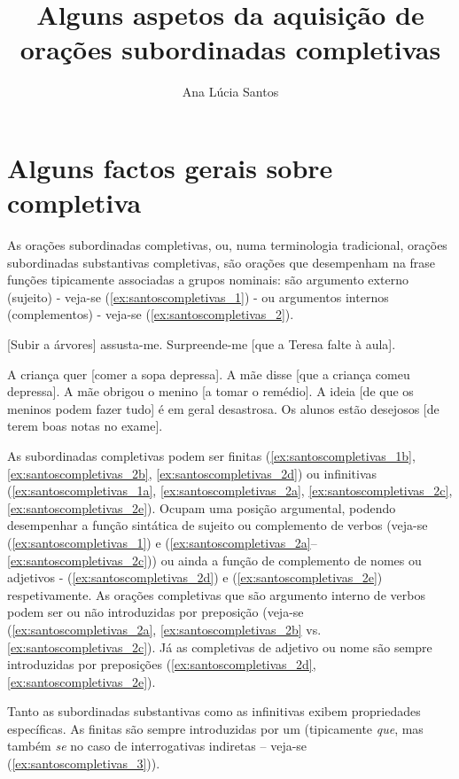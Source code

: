 \documentclass[output=paper]{LSP/langsci}
\author{Ana Lúcia Santos\affiliation{Universidade de Lisboa, Faculdade de Letras, Centro de Linguística}
}
\title{Alguns aspetos da aquisição de orações subordinadas completivas}
\begin{document}
\section{Alguns factos gerais sobre  completiva} 
\label{sec:santoscompletivas_alguns_factos}

As orações subordinadas completivas, ou, numa terminologia tradicional, orações subordinadas substantivas completivas, são orações que desempenham na frase funções tipicamente associadas a grupos nominais: são argumento externo (sujeito) - veja-se (\ref{ex:santoscompletivas_1}) - ou argumentos internos (complementos) - veja-se (\ref{ex:santoscompletivas_2}).

\ea\label{ex:santoscompletivas_1}
\ea\label{ex:santoscompletivas_1a} [Subir a árvores] assusta-me.
\ex\label{ex:santoscompletivas_1b} Surpreende-me [que a Teresa falte à aula].
\zl

\ea\label{ex:santoscompletivas_2}
\ea\label{ex:santoscompletivas_2a} A criança quer [comer a sopa depressa].
\ex\label{ex:santoscompletivas_2b} A mãe disse [que a criança comeu depressa].
\ex\label{ex:santoscompletivas_2c} A mãe obrigou o menino [a tomar o remédio].
\ex\label{ex:santoscompletivas_2d} A ideia [de que os meninos podem fazer tudo] é em geral desastrosa.
\ex\label{ex:santoscompletivas_2e} Os alunos estão desejosos [de terem boas notas no exame].
\zl

As subordinadas completivas podem ser finitas (\ref{ex:santoscompletivas_1b}, \ref{ex:santoscompletivas_2b}, \ref{ex:santoscompletivas_2d}) ou infinitivas (\ref{ex:santoscompletivas_1a}, \ref{ex:santoscompletivas_2a}, \ref{ex:santoscompletivas_2c}, \ref{ex:santoscompletivas_2e}). Ocupam uma posição argumental, podendo desempenhar a função sintática de sujeito ou complemento de verbos (veja-se (\ref{ex:santoscompletivas_1}) e (\ref{ex:santoscompletivas_2a}--\ref{ex:santoscompletivas_2c})) ou ainda a função de complemento de nomes ou adjetivos - (\ref{ex:santoscompletivas_2d}) e (\ref{ex:santoscompletivas_2e}) respetivamente. As orações completivas que são argumento interno de verbos podem ser ou não introduzidas por preposição (veja-se (\ref{ex:santoscompletivas_2a}, \ref{ex:santoscompletivas_2b} vs. \ref{ex:santoscompletivas_2c}). Já as completivas de adjetivo ou nome são sempre introduzidas por preposições (\ref{ex:santoscompletivas_2d}, \ref{ex:santoscompletivas_2e}).

Tanto as subordinadas substantivas  como as infinitivas exibem propriedades específicas. As finitas são sempre introduzidas por um  (tipicamente \textit{que}, mas também \textit{se} no caso de interrogativas indiretas – veja-se (\ref{ex:santoscompletivas_3})).
\end{document}
